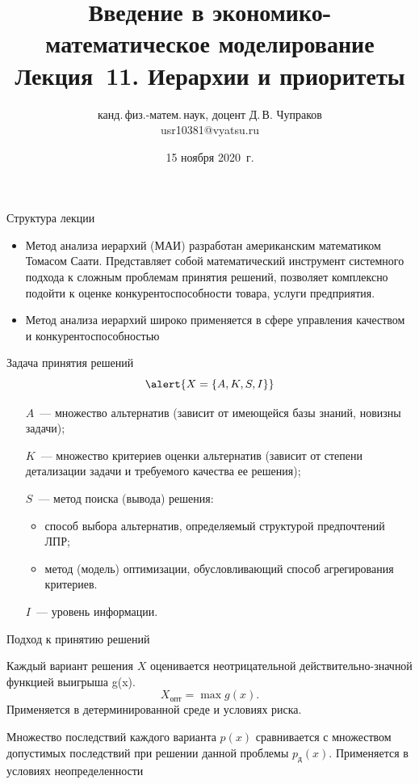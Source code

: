 \documentclass[unicode,11pt,notheorems,xcolor=table]{beamer}
\author[Д.\,В. Чупраков]{канд.\,физ.-матем.\,наук, доцент Д.\,В. Чупраков\\[6pt] usr10381@vyatsu.ru}
\institute[ВятГУ]{ФГБОУ ВО Вятский государственный университет}
\title[Лекция~11. Иерархии и приоритеты]{
	Введение в экономико-математическое моделирование\\[12pt]
	Лекция~11. Иерархии и приоритеты}
\date{15 ноября 2020~г.}
\begin{document}
\maketitle

\begin{frame}{Структура лекции}
	\tableofcontents
\end{frame}


\begin{frame}{}{}
\begin{itemize}
    \item Метод анализа иерархий (МАИ) разработан американским математиком Томасом Саати. Представляет собой математический инструмент системного подхода к сложным проблемам принятия решений, позволяет комплексно подойти к оценке конкурентоспособности товара, услуги предприятия. 
    \item Метод анализа иерархий широко применяется в сфере управления качеством и конкурентоспособностью
\end{itemize}
\end{frame}



\begin{frame}{Задача принятия решений}{}
    $$
    \alert{X=\{A, K, S, I\}}
    $$
    \begin{itemize}
        \item[$A$~---] множество альтернатив (зависит от имеющейся базы знаний, новизны задачи);
        \item[$K$~---] множество критериев оценки альтернатив (зависит от степени детализации задачи и требуемого качества ее решения);
        \item[$S$~---] метод поиска (вывода) решения:
        \begin{itemize}
            \item способ выбора альтернатив, определяемый структурой предпочтений ЛПР;
            \item метод (модель) оптимизации, обусловливающий способ агрегирования критериев. 
        \end{itemize}
        \item[$I$~---] уровень информации. 
    \end{itemize}
\end{frame}
\begin{frame}{Подход к принятию решений}{}

    Каждый вариант решения $X$ оценивается неотрицательной  действительно-значной функцией выигрыша g(x).
    $$
        X_\text{опт} =\max g(x). 
    $$
    Применяется в детерминированной среде и условиях риска.

    \medskip

    Множество последствий каждого варианта $p(x)$ сравнивается с множеством допустимых последствий при решении данной проблемы $p_\text{д}(x)$. 
    Применяется в условиях неопределенности
\end{frame}
\end{document}
